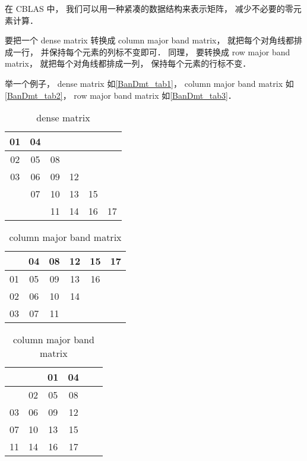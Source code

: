 
\begin{issues}
\issueDraft
\issueMissDepend
\end{issues}


在 CBLAS 中， 我们可以用一种紧凑的数据结构来表示矩阵， 减少不必要的零元素计算．

要把一个 dense matrix 转换成 column major band matrix， 就把每个对角线都排成一行， 并保持每个元素的列标不变即可． 同理， 要转换成 row major band matrix， 就把每个对角线都排成一列， 保持每个元素的行标不变．

举一个例子， dense matrix 如\autoref{BanDmt_tab1}， column major band matrix 如\autoref{BanDmt_tab2}， row major band matrix 如\autoref{BanDmt_tab3}．

\begin{table}[ht]
\centering
\caption{dense matrix}\label{BanDmt_tab1}
\begin{tabular}{|c|c|c|c|c|c|}
\hline
01  & 04  &    &    &    &   \\
\hline
02  & 05  & 08  &    &    &   \\
\hline
03  & 06  & 09  & 12  &    &   \\
\hline
   & 07  & 10 &  13  & 15  &   \\
\hline
   &    & 11 &  14  & 16  & 17 \\
\hline
\end{tabular}
\end{table}

\begin{table}[ht]
\centering
\caption{column major band matrix}\label{BanDmt_tab2}
\begin{tabular}{|c|c|c|c|c|c|}
\hline
   & 04  & 08  & 12 &  15 &  17 \\
\hline
01  & 05  & 09  & 13 &  16 &    \\
\hline
02  & 06  & 10 & 14 &     &    \\
\hline
03  & 07  & 11 &    &     &    \\
\hline
\end{tabular}
\end{table}

\begin{table}[ht]
\centering
\caption{column major band matrix}\label{BanDmt_tab3}
\begin{tabular}{|c|c|c|c|c|c|}
\hline
   &     &  01  &  04 \\
\hline
   &  02  &  05  &  08 \\
\hline
03  &  06  &  09  &  12 \\
\hline
07  &  10 &  13 &  15 \\
\hline
11 &  14 &  16 &  17 \\
\hline
\end{tabular}
\end{table}

